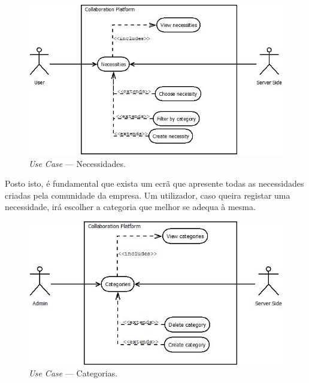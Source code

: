 \begin{figure}[H]
    \centering
    \includegraphics[scale=0.6]{figures/Necessities.jpeg}
    \caption{\textit{Use Case} --- Necessidades.}\label{fig:uc:necessities}
\end{figure}

\par
Posto isto, é fundamental que exista um ecrã que apresente todas as necessidades criadas pela comunidade da empresa. 
Um utilizador, caso queira registar uma necessidade, irá escolher a categoria que melhor se adequa à mesma. 


\begin{figure}[H]
    \centering
    \includegraphics[scale=0.6]{figures/Categories use case.jpeg}
    \caption{\textit{Use Case} --- Categorias.}\label{fig:uc:categories}
\end{figure}

